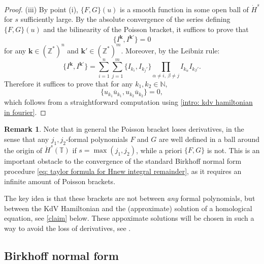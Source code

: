 \documentclass[a4paper,10pt,reqno]{article}
\theoremstyle{definition}
\theoremstyle{plain}
\theoremstyle{plain}
\theoremstyle{definition}
\theoremstyle{plain}
\theoremstyle{plain}
\theoremstyle{plain}
\theoremstyle{definition}
\newtheorem{rem}[definition]{Remark}
\theoremstyle{definition}
\def \N{\mathbb N}
\def \Z{\mathbb Z}
\def \pa{{\partial}}
\def \T{\mathbb{T}}
\def \k{\bm{k}}
\begin{document}
\begin{proof}
\noindent (iii) By point (i), $\{ F,G \}(u)$ is a smooth function in some open ball of $\dot{H}^s$ for $s$ sufficiently large. 
By the absolute convergence of the series defining $\{ F,G \}(u)$ and the bilinearity of the Poisson bracket, it suffices to prove that
\[
\{ I^{\k},I^{\k'} \} = 0
\]
for any $\k \in (\Z^*)^n$ and $\k' \in (\Z^*)^m$. Moreover, by the Leibniz rule:
\[
\{ I^{\k},I^{\k'} \} = \sum_{i=1}^n\sum_{j=1}^m \{ I_{k_i}, I_{k_j'}\} \prod_{\alpha\neq i,\ \beta\neq j} I_{k_{\alpha}} I_{k_{\beta}'}.
\]
Therefore it suffices to prove that 
for any $k_1,k_2 \in \N$,
\[
\{ u_{k_1} \overline{u}_{k_1} , u_{k_2} \overline{u}_{k_2} \} = 0,
\]
which follows from a straightforward computation using \eqref{intro: kdv hamiltonian in fourier}.
\end{proof}

\begin{rem} \label{rem: derivatives poisson bracket}
Note that in general the Poisson bracket loses derivatives, in the sense that any $j_1,j_2$-formal polynomials $F$ and $G$ are well defined in a ball around the origin of $\dot{H}^s(\T)$ if $s = \max ( j_1,j_2 )$, while a priori $\{ F,G \}$ is not.
This is an important obstacle to the convergence of the standard Birkhoff normal form procedure \eqref{eq: taylor formula for Hnew integral remainder}, as it requires an infinite amount of Poisson brackets.
\end{rem}

The key idea is that these brackets are not between \emph{any} formal polynomials, but between the KdV Hamiltonian and the (approximate) solution of a homological equation, see \eqref{claim} below. These appoximate solutions will be chosen in such a way to avoid the loss of derivatives, see .

\subsection{Birkhoff normal form} \label{section: rigorous theory}
\end{document}
